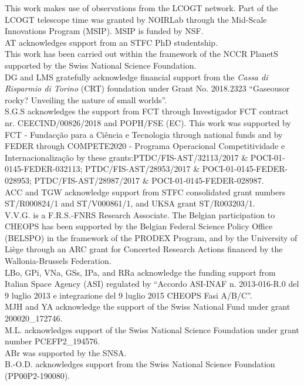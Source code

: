 This work makes use of observations from the LCOGT network. Part of the LCOGT telescope time was granted by NOIRLab through the Mid-Scale Innovations Program (MSIP). MSIP is funded by NSF.\\ %
AT acknowledges support from an STFC PhD studentship.\\ %
This work has been carried out within the framework of the NCCR PlanetS supported by the Swiss National Science Foundation.\\ %
DG and LMS gratefully acknowledge financial support from the \emph{Cassa di Risparmio di Torino} (CRT) foundation under Grant No. 2018.2323 ``Gaseousor rocky? Unveiling the nature of small worlds''.\\ %
S.G.S acknowledges the support from FCT through Investigador FCT contract nr. CEECIND/00826/2018 and  POPH/FSE (EC). This  work  was  supported  by FCT - Fundac\c{c}\~ao  para  a  Ci\^encia  e  Tecnologia through national  funds and by FEDER through COMPETE2020 - Programa Operacional Competitividade e Internacionaliza\c{c}\~ao by these grants:PTDC/FIS-AST/32113/2017 \& POCI-01-0145-FEDER-032113; PTDC/FIS-AST/28953/2017 \& POCI-01-0145-FEDER-028953; PTDC/FIS-AST/28987/2017 \& POCI-01-0145-FEDER-028987.\\ %
ACC and TGW acknowledge support from STFC consolidated grant numbers ST/R000824/1 and ST/V000861/1, and UKSA grant ST/R003203/1. \\ %
V.V.G. is a F.R.S.-FNRS Research Associate. The Belgian participation to CHEOPS has been supported by the Belgian Federal Science Policy Office (BELSPO) in the framework of the PRODEX Program, and by the University of Li\`ege through an ARC grant for Concerted Research Actions financed by the Wallonia-Brussels Federation.\\ %
LBo, GPi, VNa, GSs, IPa, and RRa acknowledge the funding support from Italian Space Agency (ASI) regulated by ``Accordo ASI-INAF n. 2013-016-R.0 del 9 luglio 2013 e integrazione del 9 luglio 2015 CHEOPS Fasi A/B/C''.\\ %
MJH and YA acknowledge the support of the Swiss National Fund under grant 200020\_172746.\\ %
M.L. acknowledges support of the Swiss National Science Foundation under grant number PCEFP2\_194576.\\ %
ABr was supported by the SNSA.\\ %
B.-O.D. acknowledges support from the Swiss National Science Foundation (PP00P2-190080).\\ %
